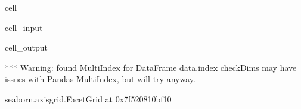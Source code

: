 \documentclass[letterpaper,table,10pt,english]{jupyterBook}
\begin{document}
\begin{sphinxuseclass}{cell}\begin{sphinxVerbatimInput}

\begin{sphinxuseclass}{cell_input}
\begin{sphinxVerbatim}[commandchars=\\\{\}]
  
     
                 
                     
\end{sphinxVerbatim}

\end{sphinxuseclass}\end{sphinxVerbatimInput}
\begin{sphinxVerbatimOutput}

\begin{sphinxuseclass}{cell_output}
\begin{sphinxVerbatim}[commandchars=\\\{\}]
*** Warning: found MultiIndex for DataFrame data.index \PYGZhy{} checkDims may have issues with Pandas MultiIndex, but will try anyway.
\end{sphinxVerbatim}

\begin{sphinxVerbatim}[commandchars=\\\{\}]
\PYGZlt{}seaborn.axisgrid.FacetGrid at 0x7f520810bf10\PYGZgt{}
\end{sphinxVerbatim}

\noindent{}

\end{sphinxuseclass}\end{sphinxVerbatimOutput}

\end{sphinxuseclass}
\end{document}
